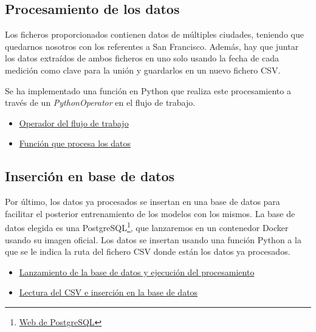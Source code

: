 \subsection{Procesamiento de los datos}
Los ficheros proporcionados contienen datos de múltiples ciudades,
teniendo que quedarnos nosotros con los referentes a San Francisco.
Además, hay que juntar los datos extraídos de ambos ficheros en uno
solo usando la fecha de cada medición como clave para la unión y guardarlos
en un nuevo fichero CSV.

Se ha implementado una función en Python que realiza este procesamiento
a través de un \textit{PythonOperator} en el flujo de trabajo.

\begin{itemize}
    \item\href{
        https://github.com/Varrrro/forecast/blob/master/airflow/tasks.py#L71-L82
    }{Operador del flujo de trabajo}
    \item\href{
        https://github.com/Varrrro/forecast/blob/master/airflow/functions.py#L10-L24
    }{Función que procesa los datos}
\end{itemize}

\subsection{Inserción en base de datos}
Por último, los datos ya procesados se insertan en una base de datos
para facilitar el posterior entrenamiento de los modelos con los mismos.
La base de datos elegida es una PostgreSQL\footnote{\href{https://www.postgresql.org/}{Web de PostgreSQL}},
que lanzaremos en un contenedor Docker usando su imagen oficial. Los
datos se insertan usando una función Python a la que se le indica la ruta
del fichero CSV donde están los datos ya procesados.

\begin{itemize}
    \item\href{
        https://github.com/Varrrro/forecast/blob/master/airflow/tasks.py#L84-L101
    }{Lanzamiento de la base de datos y ejecución del procesamiento}
    \item\href{
        https://github.com/Varrrro/forecast/blob/master/airflow/functions.py#L26-L29
    }{Lectura del CSV e inserción en la base de datos}
\end{itemize}

